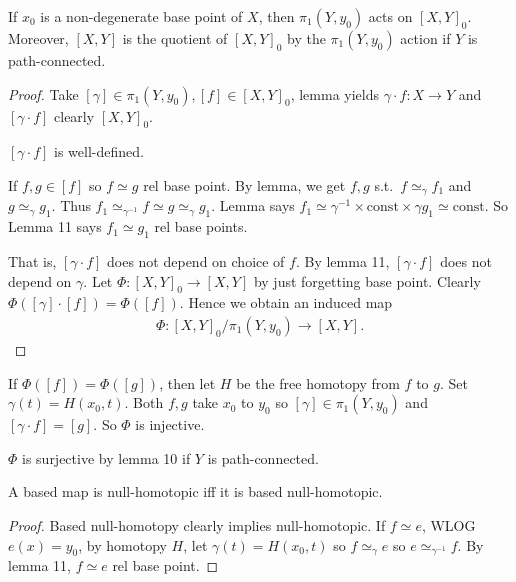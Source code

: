 \documentclass[12pt,class=article,crop=false]{standalone}
\begin{document}
\begin{thm}
	If $ x_0$ is a non-degenerate base point of $ X$, then  $ \pi_1(Y,y_0)$ acts on $ [X, Y]_0$. Moreover, $ [X, Y]$ is the quotient of $ [X, Y]_0$ by the $ \pi_1(Y,y_0)$ action if $ Y$ is path-connected.
\end{thm}

\begin{proof}
	Take $ [ \gamma] \in \pi_1(Y,y_0), [f] \in [X, Y]_0$, lemma yields $ \gamma \cdot f: X \to Y$ and $ [ \gamma \cdot f]$ clearly $ [X, Y]_0$.
	\begin{claim}
		$ [ \gamma \cdot f]$ is well-defined. 
	\end{claim}
		If $ f,g \in [f]$ so $ f \simeq g$ rel base point. By lemma, we get $ f,g$  s.t.\ $ f \simeq _{ \gamma} f_1$ and $ g \simeq _{ \gamma} g_1$. Thus $ f_1 \simeq _{ \gamma ^{-1}} f \simeq g \simeq _{ \gamma} g_1$. Lemma says $ f_1 \simeq \gamma^{-1} \times \text{const} \times \gamma g_1 \simeq \text{const}  $. So Lemma 11 says $ f_1 \simeq g_1$ rel base points.

		That is, $ [ \gamma \cdot f]$ does not depend on choice of $ f$. By lemma 11,  $ [ \gamma \cdot f]$ does not depend on $ \gamma$. Let $ \Phi: [X, Y]_0 \to [X, Y]$ by just forgetting base point. Clearly $ \Phi( [ \gamma] \cdot [ f]) = \Phi([f])$. Hence we obtain an induced map
		\begin{align*}
			\Phi: [X, Y]_0 / \pi_1(Y,y_0) \to [X, Y].
		\end{align*}
\end{proof}
If $ \Phi([f]) = \Phi([g])$, then let $ H$ be the free homotopy from  $ f$ to  $ g$. Set  $ \gamma(t) = H(x_0,t)$. Both $ f,g$ take  $ x_0$ to $ y_0$ so $ [ \gamma] \in \pi_1(Y,y_0)$ and $ [ \gamma \cdot f] = [g]$. So $ \Phi$ is injective.

$ \Phi$ is surjective by lemma 10 if $ Y$ is path-connected.

\begin{coro}
A based map is null-homotopic iff it is based null-homotopic.
\end{coro}
\begin{proof}
Based null-homotopy clearly implies null-homotopic. If $ f \simeq e$, WLOG $ e(x)=y_0$, by homotopy $ H$, let  $ \gamma(t) = H(x_0,t)$ so $ f \simeq _{ \gamma} e$ so $ e \simeq _{ \gamma ^{-1}} f$. By lemma 11, $ f \simeq e$ rel base point.
\end{proof}
\end{document}
